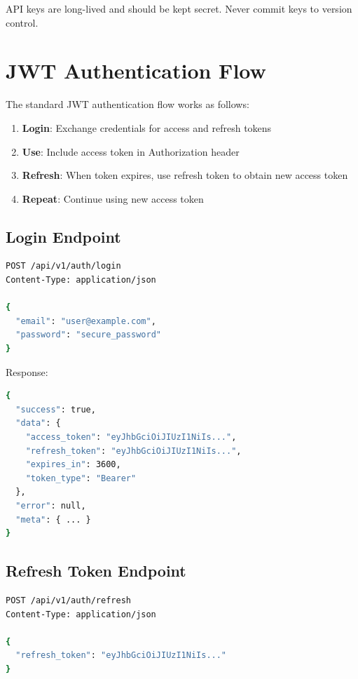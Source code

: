 \documentclass{report}
\begin{document}
API keys are long-lived and should be kept secret. Never commit keys to version control.

\section{JWT Authentication Flow}

The standard JWT authentication flow works as follows:

\begin{enumerate}
    \item \textbf{Login}: Exchange credentials for access and refresh tokens
    \item \textbf{Use}: Include access token in Authorization header
    \item \textbf{Refresh}: When token expires, use refresh token to obtain new access token
    \item \textbf{Repeat}: Continue using new access token
\end{enumerate}

\subsection{Login Endpoint}

\begin{lstlisting}[language=bash]
POST /api/v1/auth/login
Content-Type: application/json

{
  "email": "user@example.com",
  "password": "secure_password"
}
\end{lstlisting}

Response:

\begin{lstlisting}[language=bash]
{
  "success": true,
  "data": {
    "access_token": "eyJhbGciOiJIUzI1NiIs...",
    "refresh_token": "eyJhbGciOiJIUzI1NiIs...",
    "expires_in": 3600,
    "token_type": "Bearer"
  },
  "error": null,
  "meta": { ... }
}
\end{lstlisting}

\subsection{Refresh Token Endpoint}

\begin{lstlisting}[language=bash]
POST /api/v1/auth/refresh
Content-Type: application/json

{
  "refresh_token": "eyJhbGciOiJIUzI1NiIs..."
}
\end{lstlisting}
\end{document}
